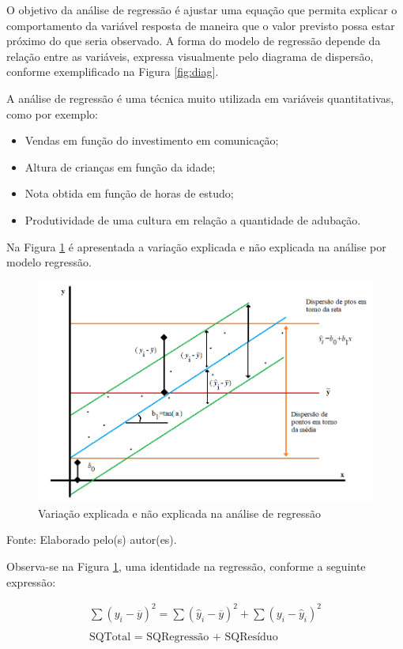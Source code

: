 \documentclass[12pt,brazil,oneside]{book}
\begin{document}
O objetivo da análise de regressão é ajustar uma equação que permita explicar o comportamento da variável resposta de maneira que o valor previsto possa estar próximo do que seria observado. A forma do modelo de regressão depende da relação entre as variáveis, expressa visualmente pelo diagrama de dispersão, conforme exemplificado na Figura \ref{fig:diag}.

A análise de regressão é uma técnica muito utilizada em variáveis quantitativas, como por exemplo:

\begin{itemize}
\item
  Vendas em função do investimento em comunicação;
\item
  Altura de crianças em função da idade;
\item
  Nota obtida em função de horas de estudo;
\item
  Produtividade de uma cultura em relação a quantidade de adubação.
\end{itemize}

Na Figura \ref{fig:regress} é apresentada a variação explicada e não explicada na análise por modelo regressão.

\begin{figure}[H]

{\centering \includegraphics[width=0.8\linewidth]{regress1} 

}

\caption{Variação explicada e não explicada na análise de regressão}\label{fig:regress}
\end{figure}

Fonte: Elaborado pelo(s) autor(es).

Observa-se na Figura \ref{fig:regress}, uma identidade na regressão, conforme a seguinte expressão:

\[
\begin{matrix}
\sum (y_i-\overline{y}) ^{2} = \sum (\hat{y}_i-\overline{y})^2 + \sum (y_i-\hat{y}_i)^2 \\
\\
\text{SQTotal = SQRegressão + SQResíduo}
\end{matrix}
\]
\end{document}
